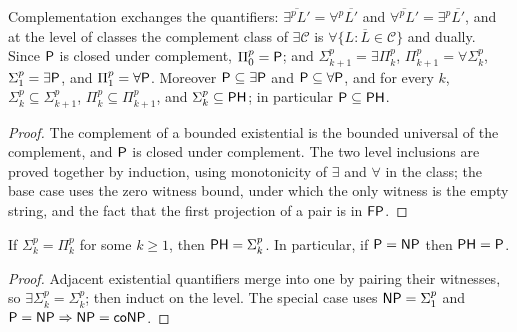 \begin{proposition}
  \label{prop:randomness-ph-levels}
  \leanok
  Complementation exchanges the quantifiers:
  $\overline{\exists^p L'} = \forall^p \overline{L'}$ and
  $\overline{\forall^p L'} = \exists^p \overline{L'}$, and at the level of
  classes the complement class of $\exists \mathcal{C}$ is
  $\forall \{L : \overline{L} \in \mathcal{C}\}$ and dually. Since $\mathsf{P}$ is
  closed under complement, $\Pi^p_0 = \mathsf{P}$; and
  $\Sigma^p_{k+1} = \exists \Pi^p_k$, $\Pi^p_{k+1} = \forall \Sigma^p_k$,
  $\Sigma^p_1 = \exists \mathsf{P}$, and $\Pi^p_1 = \forall \mathsf{P}$. Moreover
  $\mathsf{P} \subseteq \exists \mathsf{P}$ and $\mathsf{P} \subseteq \forall \mathsf{P}$, and
  for every $k$, $\Sigma^p_k \subseteq \Sigma^p_{k+1}$,
  $\Pi^p_k \subseteq \Pi^p_{k+1}$, and $\Sigma^p_k \subseteq \mathsf{PH}$; in
  particular $\mathsf{P} \subseteq \mathsf{PH}$.
\end{proposition}
\begin{proof}
  \leanok
  The complement of a bounded existential is the bounded universal of the
  complement, and $\mathsf{P}$ is closed under complement. The two level
  inclusions are proved together by induction, using monotonicity of $\exists$
  and $\forall$ in the class; the base case uses the zero witness bound, under
  which the only witness is the empty string, and the fact that the first
  projection of a pair is in $\mathsf{FP}$.
\end{proof}

\begin{theorem}
  \label{thm:randomness-ph-collapse}
  If $\Sigma^p_k = \Pi^p_k$ for some $k \ge 1$, then $\mathsf{PH} = \Sigma^p_k$.
  In particular, if $\mathsf{P} = \mathsf{NP}$ then $\mathsf{PH} = \mathsf{P}$.
\end{theorem}
\begin{proof}
  Adjacent existential quantifiers merge into one by pairing their witnesses,
  so $\exists \Sigma^p_k = \Sigma^p_k$; then induct on the level. The special
  case uses $\mathsf{NP} = \Sigma^p_1$ and $\mathsf{P} = \mathsf{NP} \Rightarrow
  \mathsf{NP} = \mathsf{coNP}$.
\end{proof}

